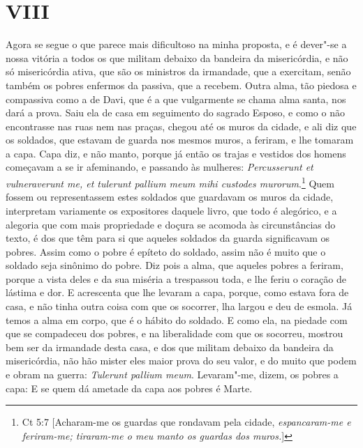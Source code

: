\section{VIII}

Agora se segue o que parece mais dificultoso na minha proposta, e é
dever"-se a nossa vitória a todos os que militam debaixo da bandeira da
misericórdia, e não só misericórdia ativa, que são os ministros da
irmandade, que a exercitam, senão também os pobres enfermos da passiva,
que a recebem. Outra alma, tão piedosa e compassiva como a de Davi, que
é a que vulgarmente se chama alma santa, nos dará a prova. Saiu ela de
casa em seguimento do sagrado Esposo, e como o não encontrasse nas ruas
nem nas praças, chegou até os muros da cidade, e ali diz que os
soldados, que estavam de guarda nos mesmos muros, a feriram, e lhe
tomaram a capa. Capa diz, e não manto, porque já então os trajas e
vestidos dos homens começavam a se ir afeminando, e passando às
mulheres: \emph{Percusserunt et vulneraverunt me, et tulerunt pallium
meum mihi custodes murorum}.\footnote{Ct 5:7 [Acharam-me os guardas que rondavam pela cidade, \textit{espancaram-me e feriram-me; tiraram-me o meu manto os guardas dos muros.}]} Quem fossem ou representassem
estes soldados que guardavam os muros da cidade, interpretam variamente
os expositores daquele livro, que todo é alegórico, e a alegoria que com
mais propriedade e doçura se acomoda às circunstâncias do texto, é dos
que têm para si que aqueles soldados da guarda significavam os pobres.
Assim como o pobre é epíteto do soldado, assim não é muito que o soldado
seja sinônimo do pobre. Diz pois a alma, que aqueles pobres a feriram,
porque a vista deles e da sua miséria a trespassou toda, e lhe feriu o
coração de lástima e dor. E acrescenta que lhe levaram a capa, porque,
como estava fora de casa, e não tinha outra coisa com que os socorrer,
lha largou e deu de esmola. Já temos a alma em corpo, que é o hábito do
soldado. E como ela, na piedade com que se compadeceu dos pobres, e na
liberalidade com que os socorreu, mostrou bem ser da irmandade desta
casa, e dos que militam debaixo da bandeira da misericórdia, não hão
mister eles maior prova do seu valor, e do muito que podem e obram na
guerra: \emph{Tulerunt pallium meum}. Levaram"-me, dizem, os pobres a
capa: E se quem dá ametade da capa aos pobres é Marte.

